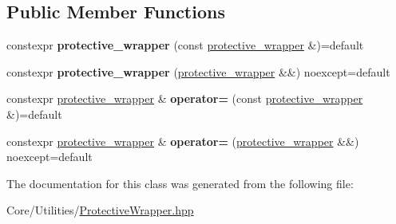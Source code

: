 \subsection*{Public Member Functions}
\begin{DoxyCompactItemize}
\item 
\mbox{\label{classsequoia_1_1utilities_1_1protective__wrapper_3_01_t_00_01true_01_4_aa9d87d6daa285b97c345c29853fe0baf}} 
constexpr {\bfseries protective\+\_\+wrapper} (const \mbox{\hyperlink{classsequoia_1_1utilities_1_1protective__wrapper}{protective\+\_\+wrapper}} \&)=default
\item 
\mbox{\label{classsequoia_1_1utilities_1_1protective__wrapper_3_01_t_00_01true_01_4_a1ec1bfbb30eb817bc715a03ee0171d1d}} 
constexpr {\bfseries protective\+\_\+wrapper} (\mbox{\hyperlink{classsequoia_1_1utilities_1_1protective__wrapper}{protective\+\_\+wrapper}} \&\&) noexcept=default
\item 
\mbox{\label{classsequoia_1_1utilities_1_1protective__wrapper_3_01_t_00_01true_01_4_a76f89c4d6fe6fe7ce576539c93d0541e}} 
constexpr \mbox{\hyperlink{classsequoia_1_1utilities_1_1protective__wrapper}{protective\+\_\+wrapper}} \& {\bfseries operator=} (const \mbox{\hyperlink{classsequoia_1_1utilities_1_1protective__wrapper}{protective\+\_\+wrapper}} \&)=default
\item 
\mbox{\label{classsequoia_1_1utilities_1_1protective__wrapper_3_01_t_00_01true_01_4_a9970430d7feec8d24f1a94132734359e}} 
constexpr \mbox{\hyperlink{classsequoia_1_1utilities_1_1protective__wrapper}{protective\+\_\+wrapper}} \& {\bfseries operator=} (\mbox{\hyperlink{classsequoia_1_1utilities_1_1protective__wrapper}{protective\+\_\+wrapper}} \&\&) noexcept=default
\end{DoxyCompactItemize}


The documentation for this class was generated from the following file\+:\begin{DoxyCompactItemize}
\item 
Core/\+Utilities/\mbox{\hyperlink{_protective_wrapper_8hpp}{Protective\+Wrapper.\+hpp}}\end{DoxyCompactItemize}
